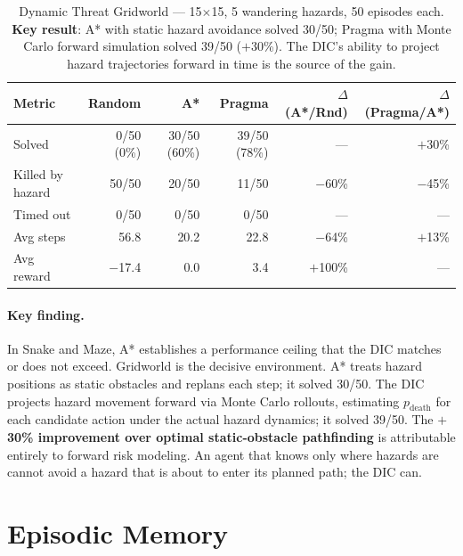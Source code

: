 \documentclass[11pt,letterpaper]{article}
\begin{document}
\begin{table}[H]
\centering
\begin{tabular}{lrrrrr}
\toprule
\textbf{Metric} & \textbf{Random} & \textbf{A*} & \textbf{Pragma} & \textbf{$\Delta$(A*/Rnd)} & \textbf{$\Delta$(Pragma/A*)} \\
\midrule
Solved           & 0/50 (0\%)  & 30/50 (60\%) & 39/50 (78\%) & ---       & $+$30\% \\
Killed by hazard & 50/50       & 20/50        & 11/50        & $-$60\%   & $-$45\% \\
Timed out        & 0/50        & 0/50         & 0/50         & ---       & ---     \\
Avg steps        & 56.8        & 20.2         & 22.8         & $-$64\%   & $+$13\% \\
Avg reward       & $-$17.4     & 0.0          & 3.4          & $+$100\%  & ---     \\
\bottomrule
\end{tabular}
\caption{Dynamic Threat Gridworld --- 15$\times$15, 5 wandering hazards, 50
episodes each. \textbf{Key result}: A* with static hazard avoidance solved 30/50;
Pragma with Monte Carlo forward simulation solved 39/50 ($+$30\%). The DIC's
ability to project hazard trajectories forward in time is the source of the gain.}
\label{tab:gridworld}
\end{table}

\paragraph{Key finding.}
In Snake and Maze, A* establishes a performance ceiling that the DIC matches or
does not exceed. Gridworld is the decisive environment. A* treats hazard positions
as static obstacles and replans each step; it solved 30/50. The DIC projects hazard
movement forward via Monte Carlo rollouts, estimating $p_{\mathrm{death}}$ for
each candidate action under the actual hazard dynamics; it solved 39/50. The
\textbf{$+$30\% improvement over optimal static-obstacle pathfinding} is attributable
entirely to forward risk modeling. An agent that knows only where hazards are cannot
avoid a hazard that is about to enter its planned path; the DIC can.

\section{Episodic Memory}
\label{sec:memory}
\end{document}
